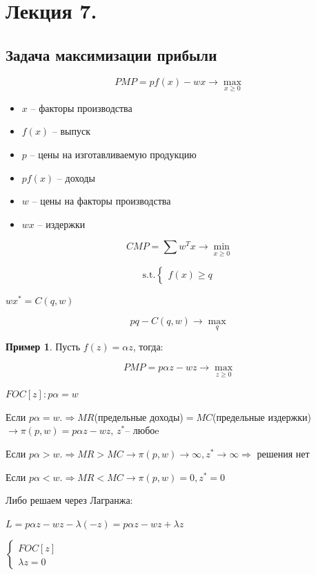 \documentclass[reqno]{article}
\theoremstyle{definition}
\theoremstyle{definition}
\theoremstyle{definition}
\newtheorem*{exmp}{Пример}
\theoremstyle{definition}
\theoremstyle{definition}
\theoremstyle{definition}
\theoremstyle{definition}
\theoremstyle{definition}
\theoremstyle{definition}
\begin{document}
	\newpage
	
	\section{Лекция 7.}
	
	\subsection{Задача максимизации прибыли}
	
	$$PMP = pf(x) - wx \rightarrow \max\limits_{x\geq 0}$$
	
	\begin{itemize}
		\item $x$ -- факторы производства 
		
		\item $f(x)$ -- выпуск
		
		\item $p$ -- цены на изготавливаемую продукцию
		
		\item $p f(x)$ -- доходы
		
		\item $w$ -- цены на факторы производства
		
		\item $wx$ -- издержки
	\end{itemize}
	
	$$CMP = \sum w^T x \rightarrow \min\limits_{x\geq 0}$$
	
	$$
	\text{s.t.}
	\begin{cases}
		f(x) \geq q
	\end{cases}
	$$
	
	$wx^* = C(q,w)$
	
	$$pq - C(q,w) \rightarrow \max\limits_q$$
	
	\begin{exmp} 
		
		Пусть $f(z) = \alpha z$, тогда: 
		
		$$PMP = p \alpha z - wz \rightarrow \max\limits_{z\geq 0}$$
		
		$FOC[z]: p \alpha = w$
		
		Если $p \alpha = w. \Rightarrow MR$(предельные доходы)$ = MC$(предельные издержки) $\rightarrow \pi (p,w) = p \alpha z - wz, \, z^*$-- любоe
		
		Если $p \alpha > w. \Rightarrow MR > MC \rightarrow \pi (p,w) \rightarrow \infty , z^* \rightarrow \infty \Rightarrow$ решения нет
		
		Если $p \alpha < w. \Rightarrow MR < MC \rightarrow \pi (p,w) = 0 , z^* = 0$
		
		Либо решаем через Лагранжа:
		
		$L =  p \alpha z - wz - \lambda (-z) =  p \alpha z - wz + \lambda z$
		
		$
		\begin{cases}
			FOC[z] \\
			
			\lambda z = 0
		\end{cases}
		$
		
	\end{exmp}
	
\end{document}
